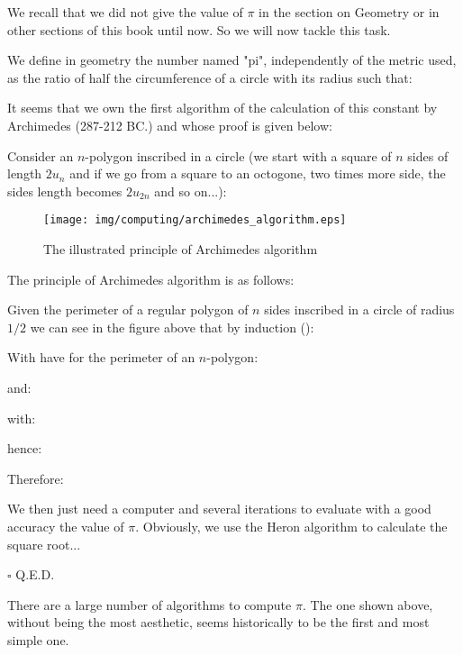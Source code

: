 	We recall that we did not give the value of $\pi$ in the section on Geometry or in other sections of this book until now. So we will now tackle this task.
	
	We define in geometry the number named "pi", independently of the metric used, as the ratio of half the circumference of a circle with its radius such that:
	
	It seems that we own the first algorithm of the calculation of this constant by Archimedes (287-212 BC.) and whose proof is given below:
	\begin{dem}
		Consider an $n$-polygon inscribed in a circle (we start with a square of $n$ sides of length $2u_n$ and if we go from a square to an octogone, two times more side, the sides length becomes $2u_{2n}$ and so on...):
		\begin{figure}[H]
			\begin{center}
			\texttt{[image: img/computing/archimedes\_algorithm.eps]}
			\end{center}	
			\caption{The illustrated principle of Archimedes algorithm}
		\end{figure}
	The principle of Archimedes algorithm is as follows:
	
	Given the perimeter of a regular polygon of $n$ sides inscribed in a circle of radius $1/2$ we can see in the figure above that by induction ():
	
	With have for the perimeter of an $n$-polygon:
	
	and:
	
	with:
	
	hence:
	
	Therefore:
	
	We then just need a computer and several iterations to evaluate with a good accuracy the value of $\pi$. Obviously, we use the Heron algorithm to calculate the square root...
	\begin{flushright}
		$\square$  Q.E.D.
	\end{flushright}
	\end{dem}
	
	\begin{tcolorbox}[title=Remark,colframe=black,arc=10pt]
	There are a large number of algorithms to compute $\pi$. The one shown above, without being the most aesthetic, seems historically to be the first and most simple one.
	\end{tcolorbox}
	
	\pagebreak

